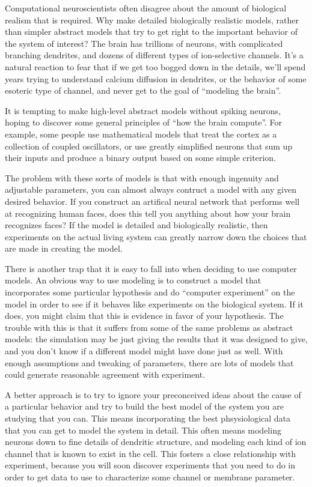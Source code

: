 \documentclass[12pt]{article}
\begin{document}
Computational neuroscientists often disagree about the amount of biological realism that is required. Why make detailed biologically realistic models, rather than simpler abstract models that try to get right to the important behavior of the system of interest? The brain has trillions of neurons, with complicated branching dendrites, and dozens of different types of ion-selective channels. It's a natural reaction to fear that if we get too bogged down in the details, we'll spend years trying to understand calcium diffusion in dendrites, or the behavior of some esoteric type of channel, and never get to the goal of ``modeling the brain''.

It is tempting to make high-level abstract models without spiking neurons, hoping to discover some general principles of ``how the brain compute''. For example, some people use mathematical models that treat the cortex as a collection of coupled oscillators, or use greatly simplified neurons that sum up their inputs and produce a binary output based on some simple criterion.

The problem with these sorts of models is that with enough ingenuity and adjustable parameters, you can almost always contruct a model with any given desired behavior. If you construct an artifical neural network that performs well at recognizing human faces, does this tell you anything about how your brain recognizes faces? If the model is detailed and biologically realistic, then experiments on the actual living system can greatly narrow down the choices that are made in creating the model.

There is another trap that it is easy to fall into when deciding to use computer models. An obvious way to use modeling is to construct a model that incorporates some particular hypothesis and do ``computer experiment'' on the model in order to see if it behaves like experiments on the biological system. If it does, you might claim that this is evidence in favor of your hypothesis. The trouble with this is that it suffers from some of the same problems as abstract models: the simulation may be just giving the results that it was designed to give, and you don't know if a different model might have done just as well. With enough assumptions and tweaking of parameters, there are lots of models that could generate reasonable agreement with experiment.

A better approach is to try to ignore your preconceived ideas about the cause of a particular behavior and try to build the best model of the system you are studying that you can. This means incorporating the best phsysiological data that you can get to model the system in detail. This often means modeling neurons down to fine details of dendritic structure, and modeling each kind of ion channel that is known to exist in the cell. This fosters a close relationship with experiment, because you will soon discover experiments that you need to do in order to get data to use to characterize some channel or membrane parameter.
\end{document}
